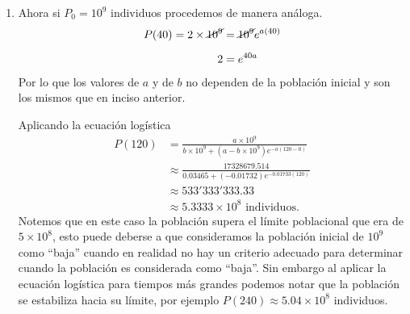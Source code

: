 \documentclass[14pt]{extarticle}
\begin{document}
\begin{enumerate}
{\begin{enumerate}
        		\item Ahora si $P_0=10^9$ individuos procedemos de manera
        		análoga.
        		\begin{align*}
        		P(40)=2\times\cancel{10^9}&=\cancel{10^9}e^{a(40)}\\[.2cm]
        		2 &= e^{40a}
        		\end{align*}
        		Por lo que los valores de $a$ y de $b$ no dependen de la
        		población inicial y son los mismos que en inciso anterior.

        		Aplicando la ecuación logística
        		\begin{align*}
        		P(120) &= \frac{a\times 10^9}
        		{b\times 10^9+(a-b\times 10^9)e^{-a(120-0)}}\\[.3cm]
        		&\approx \frac{17328679.514}{0.03465+(-0.01732)
        			e^{-0.01733(120)}}\\[.3cm]
        		&\approx 533'333'333.33\\[.2cm]
        		&\approx 5.3333\times 10^8 \text{ individuos.}
        		\end{align*}
        		Notemos que en este caso la población supera el límite
        		poblacional que era de $5\times 10^8$, esto puede deberse a que
        		consideramos la población inicial de $10^9$ como ``baja''
        		cuando en realidad no hay un criterio adecuado para determinar
        		cuando la población es considerada como ``baja''. Sin embargo
        		al aplicar la ecuación logística para tiempos más grandes
        		podemos notar que la población se estabiliza hacia su límite,
        		por ejemplo $P(240)\approx5.04\times 10^8$ individuos.
        	\end{enumerate}
                }
    \end{enumerate}
\end{document}
